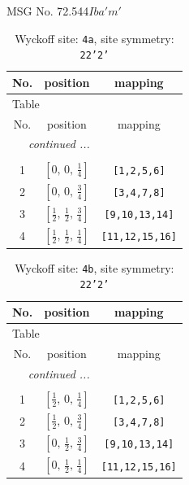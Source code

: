 \documentclass[fleqn,8pt]{jsarticle}
\begin{document}
\setcounter{MaxMatrixCols}{32}

\renewcommand{\tablename}{Table~}
\renewcommand{\figurename}{Figure~}
\begin{center}
\LARGE
MSG No. 72.544\quad$Iba'm'$
\end{center}
\renewcommand{\arraystretch}{1.2}
\begin{longtable}{ccc}
\caption{Wyckoff site: {\tt 4a}, site symmetry: {\tt 22'2'}}
 \\
 \hline \hline
No. & position & mapping \\ \hline \endfirsthead

\multicolumn{2}{l}{\tablename\ \thetable{}} \\
 \hline \hline
No. & position & mapping \\ \hline \endhead

 \hline \hline
\multicolumn{2}{r}{\footnotesize\it continued ...} \\ \endfoot

 \hline \hline
\multicolumn{2}{r}{} \\ \endlastfoot

1 & $\left[ 0,\, 0,\, \frac{1}{4} \right]$ & {\tt [1,2,5,6]} \\ \hline
2 & $\left[ 0,\, 0,\, \frac{3}{4} \right]$ & {\tt [3,4,7,8]} \\ \hline
3 & $\left[ \frac{1}{2},\, \frac{1}{2},\, \frac{3}{4} \right]$ & {\tt [9,10,13,14]} \\ \hline
4 & $\left[ \frac{1}{2},\, \frac{1}{2},\, \frac{1}{4} \right]$ & {\tt [11,12,15,16]} \\
\end{longtable}
\renewcommand{\arraystretch}{1.2}
\begin{longtable}{ccc}
\caption{Wyckoff site: {\tt 4b}, site symmetry: {\tt 22'2'}}
 \\
 \hline \hline
No. & position & mapping \\ \hline \endfirsthead

\multicolumn{2}{l}{\tablename\ \thetable{}} \\
 \hline \hline
No. & position & mapping \\ \hline \endhead

 \hline \hline
\multicolumn{2}{r}{\footnotesize\it continued ...} \\ \endfoot

 \hline \hline
\multicolumn{2}{r}{} \\ \endlastfoot

1 & $\left[ \frac{1}{2},\, 0,\, \frac{1}{4} \right]$ & {\tt [1,2,5,6]} \\ \hline
2 & $\left[ \frac{1}{2},\, 0,\, \frac{3}{4} \right]$ & {\tt [3,4,7,8]} \\ \hline
3 & $\left[ 0,\, \frac{1}{2},\, \frac{3}{4} \right]$ & {\tt [9,10,13,14]} \\ \hline
4 & $\left[ 0,\, \frac{1}{2},\, \frac{1}{4} \right]$ & {\tt [11,12,15,16]} \\
\end{longtable}
\end{document}
